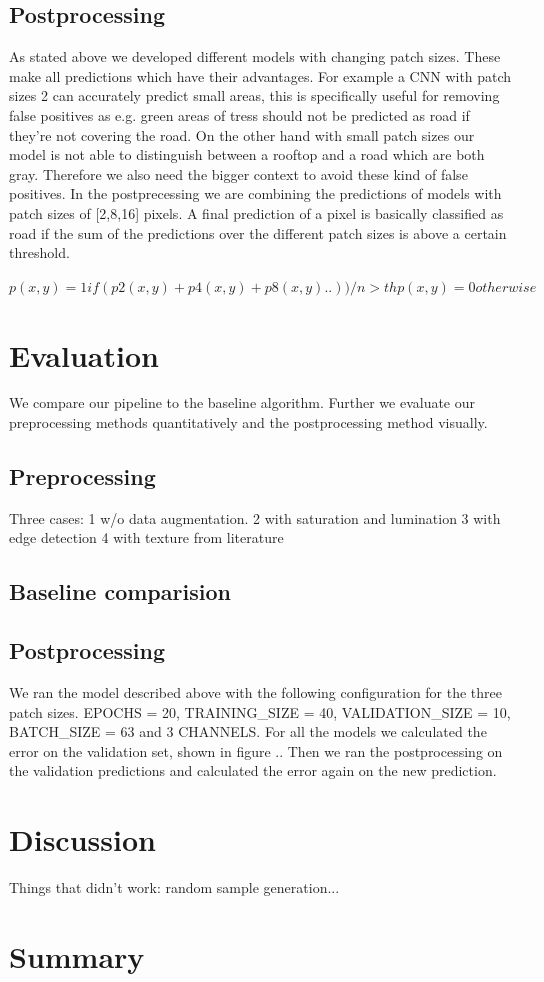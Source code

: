 \documentclass[10pt,conference,compsocconf]{IEEEtran}
\begin{document}
\subsection{Postprocessing}
As stated above we developed different models with changing patch sizes. These make all predictions which have their advantages. For example a CNN with patch sizes 2 can accurately predict small areas, this is specifically useful for removing false positives as e.g. green areas of tress should not be predicted as road if they're not covering the road. On the other hand with small patch sizes our model is not able to distinguish between a rooftop and a road which are both gray. Therefore we also need the bigger context to avoid these kind of false positives. In the postprecessing we are combining the predictions of models with patch sizes of [2,8,16] pixels. A final prediction of a pixel is basically classified as road if the sum of the predictions over the different patch sizes is above a certain threshold. 

$p(x,y) = 1 if (p2(x,y)+p4(x,y)+p8(x,y)..))/n > th
p(x,y) = 0 otherwise$




\section{Evaluation}
We compare our pipeline to the baseline algorithm. Further we evaluate our preprocessing methods quantitatively and the postprocessing method visually. 

\subsection{Preprocessing}

Three cases: 
1 w/o data augmentation.
2 with saturation and lumination
3 with edge detection
4 with texture from literature

\subsection{Baseline comparision}

\subsection{Postprocessing}
We ran the model described above with the following configuration for the three patch sizes. EPOCHS = 20, TRAINING_SIZE = 40, VALIDATION_SIZE = 10, BATCH_SIZE = 63 and 3 CHANNELS. For all the models we calculated the error on the validation set, shown in figure .. Then we ran the postprocessing on the validation predictions and calculated the error again on the new prediction.


\section{Discussion}
Things that didn't work: random sample generation...


\section{Summary}




\end{document}
